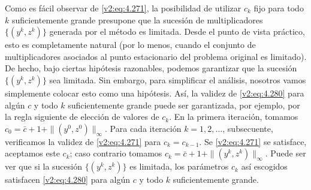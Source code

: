 Como es fácil observar de \eqref{v2:eq:4.271}, la posibilidad de utilizar $c_k$ fijo para todo $k$ suficientemente grande presupone que la sucesión de multiplicadores $\{(y^k, z^k)\}$ generada por el método es limitada. Desde el punto de vista práctico, esto es completamente natural (por lo menos, cuando el conjunto de multiplicadores asociados al punto estacionario del problema original es limitado). De hecho, bajo ciertas hipótesis razonables, podemos garantizar que la sucesión $\{(y^k, z^k)\}$ sea limitada. Sin embargo, para simplificar el análisis, nosotros vamos simplemente colocar esto como una hipótesis. Así, la validez de \eqref{v2:eq:4.280} para algún $c$ y todo $k$ suficientemente grande puede ser garantizada, por ejemplo, por la regla siguiente de elección de valores de $c_k$. En la primera iteración, tomamos $c_0 = \bar{c} + 1 + \|(y^0, z^0)\|_\infty$. Para cada iteración $k = 1, 2, \dots$, subsecuente, verificamos la validez de \eqref{v2:eq:4.271} para $c_k = c_{k-1}$. Se \eqref{v2:eq:4.271} se satisface, aceptamos este $c_k$; caso contrario tomamos $c_k = \bar{c} + 1 + \|(y^k, z^k)\|_\infty$. Puede ser ver que si la sucesión $\{(y^k, z^k)\}$ es limitada, los parámetros $c_k$ así escogidos satisfacen \eqref{v2:eq:4.280} para algún $c$ y todo $k$ suficientemente grande.

